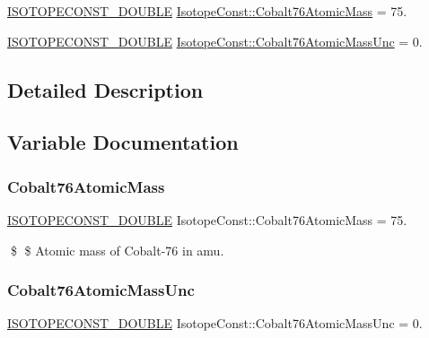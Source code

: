 \begin{DoxyCompactItemize}
\item 
\mbox{\hyperlink{group___isotope_const-_macros_ga8f45a7272ce02c0b4c65c44636ed719a}{I\+S\+O\+T\+O\+P\+E\+C\+O\+N\+S\+T\+\_\+\+D\+O\+U\+B\+LE}} \mbox{\hyperlink{group___isotope_const-_cobalt-_co76_ga3ae21165bda89e0b7c9e22b14020c793}{Isotope\+Const\+::\+Cobalt76\+Atomic\+Mass}} = 75.
\item 
\mbox{\hyperlink{group___isotope_const-_macros_ga8f45a7272ce02c0b4c65c44636ed719a}{I\+S\+O\+T\+O\+P\+E\+C\+O\+N\+S\+T\+\_\+\+D\+O\+U\+B\+LE}} \mbox{\hyperlink{group___isotope_const-_cobalt-_co76_ga36d803b7ad37964908f115adfae38cc4}{Isotope\+Const\+::\+Cobalt76\+Atomic\+Mass\+Unc}} = 0.
\end{DoxyCompactItemize}


\subsection{Detailed Description}


\subsection{Variable Documentation}
\mbox{\label{group___isotope_const-_cobalt-_co76_ga3ae21165bda89e0b7c9e22b14020c793}} 
\subsubsection{\texorpdfstring{Cobalt76\+Atomic\+Mass}{Cobalt76AtomicMass}}
{\footnotesize\ttfamily \mbox{\hyperlink{group___isotope_const-_macros_ga8f45a7272ce02c0b4c65c44636ed719a}{I\+S\+O\+T\+O\+P\+E\+C\+O\+N\+S\+T\+\_\+\+D\+O\+U\+B\+LE}} Isotope\+Const\+::\+Cobalt76\+Atomic\+Mass = 75.}

\$ \$ Atomic mass of Cobalt-\/76 in amu. \mbox{\label{group___isotope_const-_cobalt-_co76_ga36d803b7ad37964908f115adfae38cc4}} 
\subsubsection{\texorpdfstring{Cobalt76\+Atomic\+Mass\+Unc}{Cobalt76AtomicMassUnc}}
{\footnotesize\ttfamily \mbox{\hyperlink{group___isotope_const-_macros_ga8f45a7272ce02c0b4c65c44636ed719a}{I\+S\+O\+T\+O\+P\+E\+C\+O\+N\+S\+T\+\_\+\+D\+O\+U\+B\+LE}} Isotope\+Const\+::\+Cobalt76\+Atomic\+Mass\+Unc = 0.}


